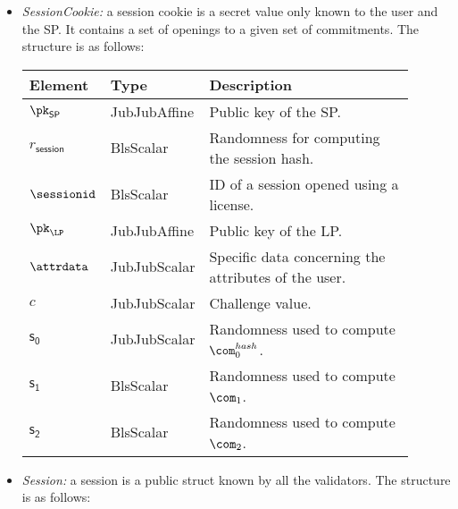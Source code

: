\begin{itemize}
	\item \emph{SessionCookie:} a session cookie is a secret value only known to the user and the SP. It contains a set of openings to a given set of commitments. The structure is as follows:
	
	
		
	\vspace{0.1cm}
	\begin{center}
		\begin{tabular}{ | p{0.15\linewidth} | p{0.2\linewidth} | p{0.55\linewidth} | } 
			\hline
			{Element} & {Type} & {Description} \\
			\hline
			$\pk_{\mathsf{SP}}$ & JubJubAffine & Public key of the SP. \\
			$r_\mathsf{session}$ & BlsScalar & Randomness for computing the session hash. \\
			$\sessionid$ & BlsScalar & ID of a session opened using a license. \\ 
			$\pk_{\LP}$ & JubJubAffine & Public key of the LP. \\ 
			$\attrdata$ & JubJubScalar & Specific data concerning the attributes of the user. \\ 
			$c$ & JubJubScalar & Challenge value. \\ 
			$\mathsf{s_0}$ & JubJubScalar & Randomness used to compute $\com_0^{hash}$. \\
			$\mathsf{s_1}$ & BlsScalar & Randomness used to compute $\com_1$. \\
			$\mathsf{s_2}$ & BlsScalar & Randomness used to compute $\com_2$. \\
			\hline
		\end{tabular}
	\end{center}	

	\item \emph{Session:} a session is a public struct known by all the validators. The structure is as follows:
	

	
	

\end{itemize}
